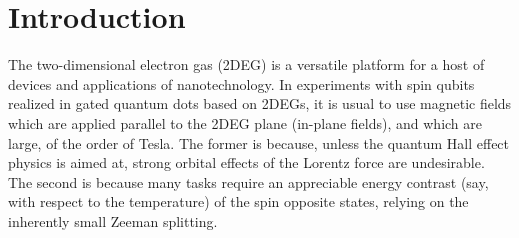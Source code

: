 \documentclass[aps,floatfix,twocolumn,showpacs,10pt,nofootinbib]{revtex4-1}
\begin{document}



%
%

\newcommand{\x}{\hat{\textbf{x}}}
\newcommand{\y}{\hat{\textbf{y}}}
\newcommand{\z}{\hat{\textbf{z}}}


\newcommand{\Bin}{\textbf{b}}
\newcommand{\Binscalar}{b}
\newcommand{\Binunit}{\hat{\textbf{b}}}
\newcommand{\Bz}{B_z}
\newcommand{\Bzvec}{B_z \z}
\newcommand{\Rin}{\textbf{r}}
\newcommand{\Rz}{z\z}
\newcommand{\Pin}{\textbf{p}}
\newcommand{\Ain}{\textbf{a}_{||}}
\newcommand{\Az}{\textbf{a}_{\perp}}

\newcommand{\ave}[2]{\overline{#1}^{#2}}

\newcommand{\flux}{\Phi}


 \section{Introduction}

The two-dimensional electron gas (2DEG) is a versatile platform for a host of devices and applications of nanotechnology.\cite{ando1982:RMP} In experiments with spin qubits realized in gated quantum dots based on 2DEGs,\cite{loss1999:PRA,hanson2007:RMP,kloeffel2013:ARCMP} it is usual to use magnetic fields which are applied parallel to the 2DEG plane (in-plane fields), and which are large, of the order of Tesla. The former is because, unless the quantum Hall effect physics is aimed at, strong orbital effects of the Lorentz force are undesirable. The second is because many tasks require an appreciable energy contrast (say, with respect to the temperature) of the spin opposite states, relying on the inherently small Zeeman splitting.
\end{document}
